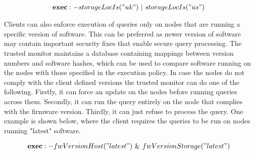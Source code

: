 \[
 \begin{array}{@{}l@{}}
 \textbf{exec}:-storageLocIs ("uk") ~ | ~ storageLocIs ("us")\\
 \end{array}
\]

Clients can also enforce execution of queries only on nodes that are running a specific version of software. This can be preferred as newer version of software may contain important security fixes that enable secure query processing. The trusted monitor maintains a database containing mappings between version numbers and software hashes, which can be used to compare software running on the nodes with those specified in the execution policy. In case the nodes do not comply with the client defined versions the trusted monitor can do one of the following. Firstly, it can force an update on the nodes before running queries across them. Secondly, it can run the query entirely on the node that complies with the firmware version. Thirdly, it can just refuse to process the query. One example is shown below, where the client requires the queries to be run on nodes running "latest" software.

\[
 \begin{array}{@{}l@{}}
 \textbf{exec}:-fwVersionHost ("latest") ~ \& ~ fwVersionStorage ("latest")\\
 \end{array}
\]
\fi

